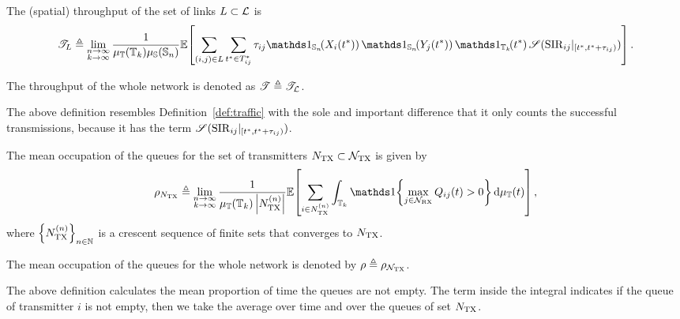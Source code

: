 

\begin{definition} \label{def:throughput}
    The (spatial) throughput of the set of links $L\subset\cal{L}$ is
    \begin{align*}
        \mathscr{T}_L \triangleq \lim_{\substack{n\to\infty\\k \to \infty}} \frac{1}{\mu_\T(\T_k)\mu_\S(\S_n)} \E\!\left[  \sum_{(i,j)\in{L}}\sum_{t^*\in T_{ij}^*} \tau_{ij} \ind_{\S_n}\!(X_i(t^*))\,\ind_{\S_n}\!(Y_j(t^*))\, \ind_{\T_k}\!(t^*)\,\mathscr{S}(\SIR_{ij}\vert_{[t^*,t^*+\tau_{ij})}) \right].
    \end{align*}
    
    The throughput of the whole network is denoted as $\mathscr{T} \triangleq \mathscr{T}_\cal{L}$.
\end{definition}

The above definition resembles Definition~\ref{def:traffic} with the sole and important difference that it only counts the successful transmissions, because it has the term $\mathscr{S}(\SIR_{ij}\vert_{[t^*,t^*+\tau_{ij})})$.


\begin{definition}
    The mean occupation of the queues for the set of transmitters $N_\TX\subset\cal{N}_\TX$ is given by
    \begin{align*}
        \rho_{N_\TX} \triangleq \lim_{\substack{n\to\infty\\k \to \infty}} \frac{1}{\mu_\T(\T_k) \left|N_\TX^{(n)}\right|} \E\!\left[  \sum_{i\in N_\TX^{(n)}} \int_{\T_k} \ind\!\left\{\max_{j\in\cal{N}_\RX} Q_{ij}(t) > 0\right\} \d\mu_\T(t) \right],
    \end{align*}
    where $\left\{N_\TX^{(n)}\right\}_{n\in\N}$ is a crescent sequence of finite sets that converges to $N_\TX$.
    
    The mean occupation of the queues for the whole network is denoted by $\rho \triangleq \rho_{\cal{N}_\TX}$.
\end{definition}

The above definition calculates the mean proportion of time the queues are not empty. The term inside the integral indicates if the queue of transmitter $i$ is not empty, then we take the average over time and over the queues of set $N_\TX$.
%

